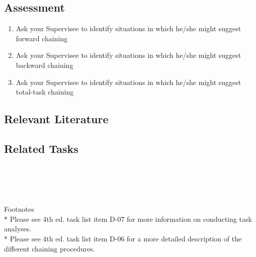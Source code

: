 \subsection{Assessment}
\begin{enumerate}
\item Ask your Supervisee to identify situations in which he/she might suggest forward chaining
\item Ask your Supervisee to identify situations in which he/she might suggest backward chaining
\item Ask your Supervisee to identify situations in which he/she might suggest total-task chaining
\end{enumerate}
%
\subsection{Relevant Literature}
\begin{refsection}
\nocite{test,alang2017police,clayton2018black}
\printbibliography[heading=none]
\end{refsection}
%
\subsection{Related Tasks}
\fourdSix{}\\
\fourdSeven{}\\
\fourjTwo{}\\
\fourjFive{}\\
%
Footnotes\\
* Please see 4th ed. task list item D-07 for more information on conducting task analyses.\\
* Please see 4th ed. task list item D-06 for a more detailed description of the different chaining procedures.\\
%
%
%
%
%
%
%
%
%
%
\section[\fourjFour{}]{\fourjFour{}%
              }
